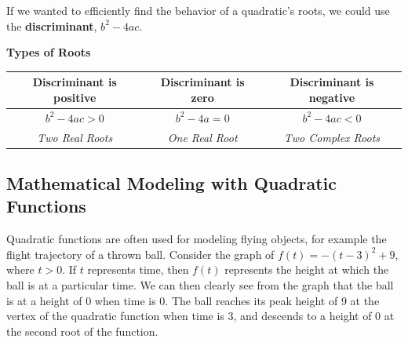 \documentclass{article}
\begin{document}
    \noindent If we wanted to efficiently find the behavior of a quadratic's roots, we could use the
    \textbf{discriminant}, $b^2-4ac$. \\

    \begin{center}
        \color{purple} \textbf{Types of Roots} \color{black} \\
        \begin{tabular}{|c|c|c|}
            \hline
            Discriminant is positive & Discriminant is zero   & Discriminant is negative   \\
            \hline
            $b^2-4ac>0$              & $b^2-4a=0$             & $b^2-4ac<0$                \\
            \hline
            \textit{Two Real Roots}  & \textit{One Real Root} & \textit{Two Complex Roots} \\
            \hline
        \end{tabular}
    \end{center}

    \subsection{Mathematical Modeling with Quadratic Functions}

    Quadratic functions are often used for modeling flying objects, for example the flight trajectory of a thrown
    ball. Consider the graph of $f(t) = -(t-3)^2+9$, where $t>0$. If $t$ represents time, then
    $f(t)$ represents the height at which the ball is at a particular time. We can then clearly
    see from the graph that the ball is at a height of 0 when time is 0. The ball reaches its peak
    height of 9 at the vertex of the quadratic function when time is 3, and descends to a height of
    0 at the second root of the function.

    \begin{center}
    \end{center}
\end{document}
